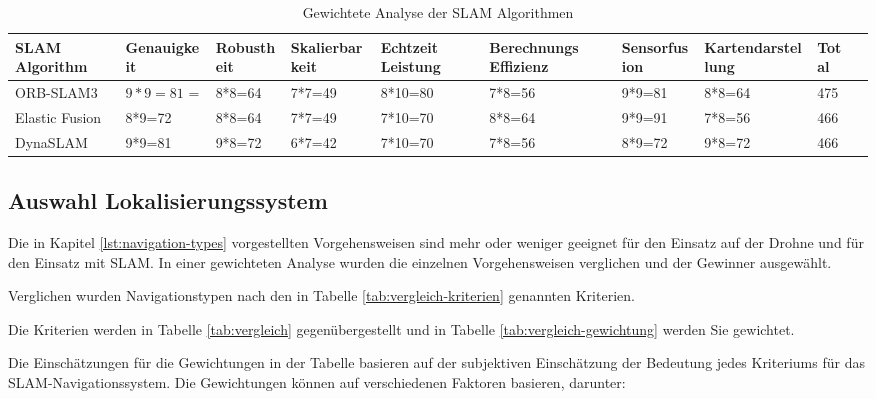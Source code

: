 \begin{table}
    \begin{center}
        \begin{adjustbox}{max width=\textwidth}
        \begin{tabular}{|l|p{2cm}|p{2cm}|p{2cm}|p{2cm}|p{2cm}|p{2cm}|p{2cm}|p{2cm}|p{2cm}|}
            \hline
            SLAM \-Algorithm & Genauig\-keit & Robust\-heit & Skalierbar\-keit & Echtzeit Leistung & Berech\-nungs Effizienz & Sensor\-fusion & Karten\-darstellung & Total\\
            \hline
            \rowcolor{green}
            ORB-SLAM3 & $9*9=81$ = & 8*8=64 & 7*7=49 & 8*10=80 & 7*8=56 & 9*9=81 & 8*8=64 &  475\\
            \hline
            Elastic Fusion & 8*9=72 & 8*8=64 & 7*7=49 & 7*10=70 & 8*8=64 & 9*9=91 & 7*8=56 &  466\\
            \hline
            DynaSLAM & 9*9=81 & 9*8=72 & 6*7=42 & 7*10=70 & 7*8=56 & 8*9=72 & 9*8=72 & 466\\
            \hline
            \end{tabular}
        \end{adjustbox}
    \caption{Gewichtete Analyse der \ac{SLAM} Algorithmen}\label{tab:vergleich-slam-analyse}
\end{center}
\end{table}

\subsection{Auswahl Lokalisierungssystem}

Die in Kapitel \ref{lst:navigation-types} vorgestellten Vorgehensweisen sind mehr oder weniger geeignet für den Einsatz auf der Drohne und für den Einsatz mit \ac{SLAM}.
In einer gewichteten Analyse wurden die einzelnen Vorgehensweisen verglichen und der Gewinner ausgewählt.

Verglichen wurden Navigationstypen nach den in Tabelle \ref{tab:vergleich-kriterien} genannten Kriterien.

Die Kriterien werden in Tabelle \ref{tab:vergleich} gegenübergestellt und in Tabelle \ref{tab:vergleich-gewichtung} werden Sie gewichtet.

Die Einschätzungen für die Gewichtungen in der Tabelle basieren auf der subjektiven Einschätzung der Bedeutung jedes Kriteriums für das \ac{SLAM}-Navigationssystem. Die Gewichtungen können auf verschiedenen Faktoren basieren, darunter:

